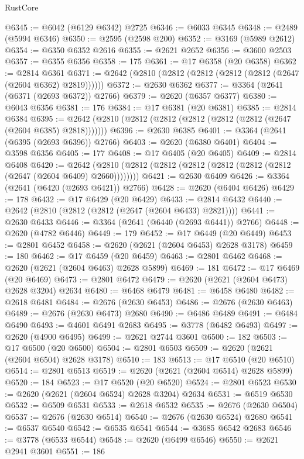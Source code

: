 \begin{lexlean}{RustCore}
\begin{coremodule}
@6345 := @6042 (@6129 @6342) @2725
@6346 := @6033 @6345
@6348 := @2489 (@5994 @6346)
@6350 := @2595 (@2598 @200)
@6352 := @3169 (@5989 @2612)
@6354 := @6350 @6352 @2616
@6355 := @2621 @2652
@6356 := @3600 @2503
@6357 := @6355 @6356
@6358 := 175
@6361 := @17 @6358 (@20 @6358)
@6362 := @2814 @6361
@6371 := @2642 (@2810 (@2812 (@2812 (@2812 (@2812 (@2647 (@2604 @6362) @2819))))))
@6372 := @2630 @6362
@6377 := @3364 (@2641 (@6371 (@2693 @6372)) @2766)
@6379 := @2620 (@6357 @6377)
@6380 := @6043 @6356
@6381 := 176
@6384 := @17 @6381 (@20 @6381)
@6385 := @2814 @6384
@6395 := @2642 (@2810 (@2812 (@2812 (@2812 (@2812 (@2812 (@2647 (@2604 @6385) @2818)))))))
@6396 := @2630 @6385
@6401 := @3364 (@2641 (@6395 (@2693 @6396)) @2766)
@6403 := @2620 (@6380 @6401)
@6404 := @3598 @6356
@6405 := 177
@6408 := @17 @6405 (@20 @6405)
@6409 := @2814 @6408
@6420 := @2642 (@2810 (@2812 (@2812 (@2812 (@2812 (@2812 (@2812 (@2647 (@2604 @6409) @2660))))))))
@6421 := @2630 @6409
@6426 := @3364 (@2641 (@6420 (@2693 @6421)) @2766)
@6428 := @2620 (@6404 @6426)
@6429 := 178
@6432 := @17 @6429 (@20 @6429)
@6433 := @2814 @6432
@6440 := @2642 (@2810 (@2812 (@2812 (@2647 (@2604 @6433) @2821))))
@6441 := @2630 @6433
@6446 := @3364 (@2641 (@6440 (@2693 @6441)) @2766)
@6448 := @2620 (@4782 @6446)
@6449 := 179
@6452 := @17 @6449 (@20 @6449)
@6453 := @2801 @6452
@6458 := @2620 (@2621 (@2604 @6453) @2628 @3178)
@6459 := 180
@6462 := @17 @6459 (@20 @6459)
@6463 := @2801 @6462
@6468 := @2620 (@2621 (@2604 @6463) @2628 @5899)
@6469 := 181
@6472 := @17 @6469 (@20 @6469)
@6473 := @2801 @6472
@6479 := @2620 (@2621 (@2604 @6473) @2628 @3204) @2634
@6480 := @6468 @6479
@6481 := @6458 @6480
@6482 := @2618 @6481
@6484 := @2676 (@2630 @6453)
@6486 := @2676 (@2630 @6463)
@6489 := @2676 (@2630 @6473) @2680
@6490 := @6486 @6489
@6491 := @6484 @6490
@6493 := @4601 @6491 @2683
@6495 := @3778 (@6482 @6493)
@6497 := @2620 (@4900 @6495)
@6499 := @2621 @2744 @3601
@6500 := 182
@6503 := @17 @6500 (@20 @6500)
@6504 := @2801 @6503
@6509 := @2620 (@2621 (@2604 @6504) @2628 @3178)
@6510 := 183
@6513 := @17 @6510 (@20 @6510)
@6514 := @2801 @6513
@6519 := @2620 (@2621 (@2604 @6514) @2628 @5899)
@6520 := 184
@6523 := @17 @6520 (@20 @6520)
@6524 := @2801 @6523
@6530 := @2620 (@2621 (@2604 @6524) @2628 @3204) @2634
@6531 := @6519 @6530
@6532 := @6509 @6531
@6533 := @2618 @6532
@6535 := @2676 (@2630 @6504)
@6537 := @2676 (@2630 @6514)
@6540 := @2676 (@2630 @6524) @2680
@6541 := @6537 @6540
@6542 := @6535 @6541
@6544 := @3685 @6542 @2683
@6546 := @3778 (@6533 @6544)
@6548 := @2620 (@6499 @6546)
@6550 := @2621 @2941 @3601
@6551 := 186

\end{coremodule}
\end{lexlean}
